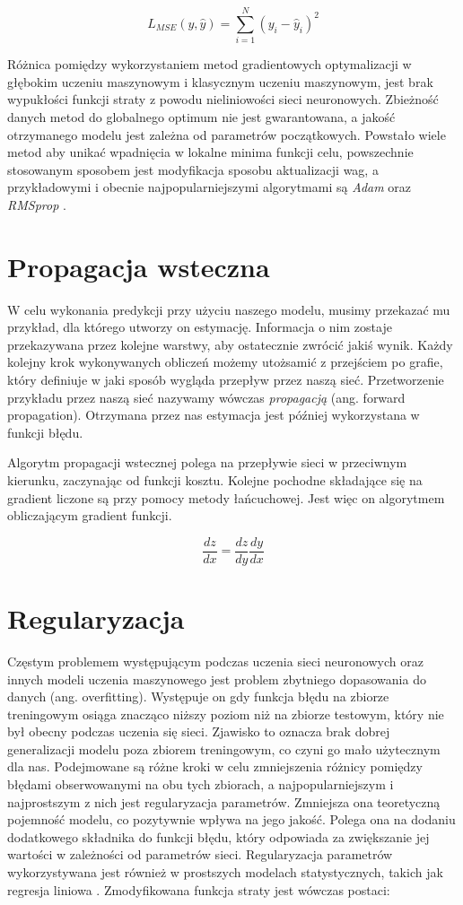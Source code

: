 \documentclass[licencjacka]{pracamgr}
\begin{document}
$$ L_{MSE}(y, \hat{y}) = \sum_{i = 1}^N (y_i - \hat{y}_i)^2$$

Różnica pomiędzy wykorzystaniem metod gradientowych optymalizacji w głębokim uczeniu maszynowym i klasycznym uczeniu maszynowym, jest brak wypukłości funkcji straty z powodu nieliniowości sieci neuronowych. Zbieżność danych metod do globalnego optimum nie jest gwarantowana, a jakość otrzymanego modelu jest zależna od parametrów początkowych. Powstało wiele metod aby unikać wpadnięcia w lokalne minima funkcji celu, powszechnie stosowanym sposobem jest modyfikacja sposobu aktualizacji wag, a przykładowymi i obecnie najpopularniejszymi algorytmami są \emph{Adam} \cite{adam} oraz \emph{RMSprop} \cite{rmsprop}. 

\section{Propagacja wsteczna}

W celu wykonania predykcji przy użyciu naszego modelu, musimy przekazać mu przykład, dla którego utworzy on estymację. Informacja o nim zostaje przekazywana przez kolejne warstwy, aby ostatecznie zwrócić jakiś wynik. Każdy kolejny krok wykonywanych obliczeń możemy utożsamić z przejściem po grafie, który definiuje w jaki sposób wygląda przepływ przez naszą sieć. Przetworzenie przykładu przez naszą sieć nazywamy wówczas \emph{propagacją} (ang. forward propagation). Otrzymana przez nas estymacja jest później wykorzystana w funkcji błędu. 

Algorytm propagacji wstecznej \cite{backprop} polega na przepływie sieci w przeciwnym kierunku, zaczynając od funkcji kosztu. Kolejne pochodne składające się na gradient liczone są przy pomocy metody łańcuchowej. Jest więc on algorytmem obliczającym gradient funkcji.

$$ \frac{dz}{dx} = \frac{dz}{dy} \frac{dy}{dx} $$
 

\section{Regularyzacja}

Częstym problemem występującym podczas uczenia sieci neuronowych oraz innych modeli uczenia maszynowego jest problem zbytniego dopasowania do danych (ang. overfitting). Występuje on gdy funkcja błędu na zbiorze treningowym osiąga znacząco niższy poziom niż na zbiorze testowym, który nie był obecny podczas uczenia się sieci. Zjawisko to oznacza brak dobrej generalizacji modelu poza zbiorem treningowym, co czyni go mało użytecznym dla nas. 
Podejmowane są różne kroki w celu zmniejszenia różnicy pomiędzy błędami obserwowanymi na obu tych zbiorach, a najpopularniejszym i najprostszym z nich jest regularyzacja parametrów. Zmniejsza ona teoretyczną pojemność modelu, co pozytywnie wpływa na jego jakość. Polega ona na dodaniu dodatkowego składnika do funkcji błędu, który odpowiada za zwiększanie jej wartości w zależności od parametrów sieci. Regularyzacja parametrów wykorzystywana jest również w prostszych modelach statystycznych, takich jak regresja liniowa \cite{lasso, ridge}. Zmodyfikowana funkcja straty jest wówczas postaci:
\end{document}
